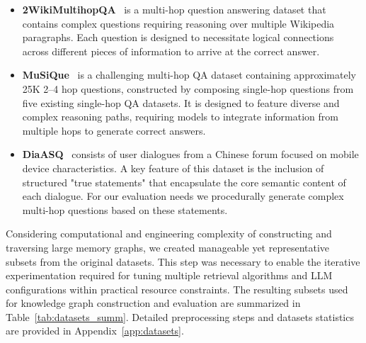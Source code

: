\begin{itemize}
    \item \textbf{2WikiMultihopQA}~\cite{ho-etal-2020-constructing} is a multi-hop question answering dataset that contains complex questions requiring reasoning over multiple Wikipedia paragraphs. Each question is designed to necessitate logical connections across different pieces of information to arrive at the correct answer.
    \item \textbf{MuSiQue}~\cite{10.1162/tacl_a_00475} is a challenging multi-hop QA dataset containing approximately 25K 2–4 hop questions, constructed by composing single-hop questions from five existing single-hop QA datasets. It is designed to feature diverse and complex reasoning paths, requiring models to integrate information from multiple hops to generate correct answers.
    \item \textbf{DiaASQ}~\cite{li-etal-2023-diaasq} consists of user dialogues from a Chinese forum focused on mobile device characteristics. A key feature of this dataset is the inclusion of structured "true statements" that encapsulate the core semantic content of each dialogue. For our evaluation needs we procedurally generate complex multi-hop questions based on these statements.
\end{itemize}

Considering computational and engineering complexity of constructing and traversing large memory graphs, we created manageable yet representative subsets from the original datasets. This step was necessary to enable the iterative experimentation required for tuning multiple retrieval algorithms and LLM configurations within practical resource constraints. The resulting subsets used for knowledge graph construction and evaluation are summarized in Table~\ref{tab:datasets_summ}. Detailed preprocessing steps and datasets statistics are provided in Appendix~\ref{app:datasets}.

\begin{table}[ht!]
\centering
\renewcommand{\arraystretch}{1.3}

\caption{Characteristics of prepared datasets for PAI-2 and baselines evaluation}
\label{tab:datasets_summ}
\end{table}


